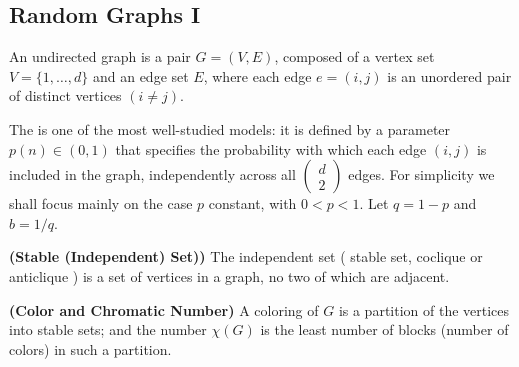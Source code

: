\documentclass{article}
\newcommand{\bfs}[1]{\textbf{({#1})}}
\begin{document}
\subsection{Random Graphs I}\label{ssec:graphexam}
An undirected graph is a pair $G=(V, E)$, composed of a vertex set $V=\{1, \ldots, d\}$ and an edge set $E$, where each edge $e=(i, j)$ is an unordered pair of distinct vertices $(i \neq j) .$ 

The  is one of the most well-studied models: it is defined by a parameter $p(n) \in(0,1)$ that specifies the probability with which each edge $(i, j)$ is included in the graph, independently across all $\left(\begin{array}{l}d \\ 2\end{array}\right)$ edges.  For simplicity we shall focus mainly on the case $p$ constant, with $0< p <1$. Let $q =1- p$
and $b =1 / q$. 
\begin{defa}{\bfs{Stable (Independent) Set)}}
 The independent set ( stable set, coclique or anticlique ) is a set of vertices in a graph, no two of which are adjacent.
\end{defa}
\begin{defa}{\bfs{Color and  Chromatic Number}}
A coloring of $G$ is a partition of the vertices into stable sets; and the  number $\chi(G)$ is the least number of blocks (number of colors) in such a partition.
\end{defa}
\end{document}
